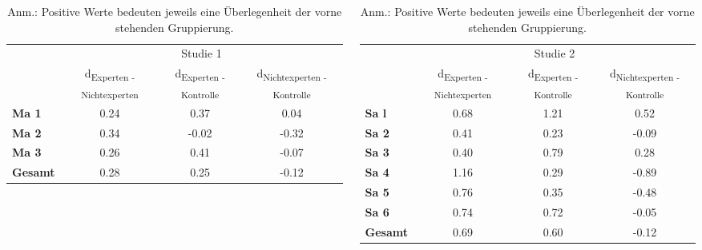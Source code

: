 \documentclass[final]{beamer}
\newlength{\onecolwid}
\newlength{\twocolwid}
\begin{document}
\begin{frame}[t]
\begin{columns}[t]
\begin{column}{\twocolwid}
\begin{columns}[t,totalwidth=\twocolwid]
\begin{column}{\onecolwid}
\begin{table}
\begin{tabular}{lccc}
\toprule 
 & \multicolumn{3}{c}{Studie 1} \\
\cmidrule{2-4}
 & d\textsubscript{Experten - Nichtexperten} & d\textsubscript{Experten - Kontrolle} & d\textsubscript{Nichtexperten - Kontrolle} \\
\midrule 
\textbf{Ma 1} & 0.24 & 0.37 & 0.04 \\
\textbf{Ma 2} & 0.34 & -0.02 & -0.32 \\
\textbf{Ma 3} & 0.26 & 0.41 & -0.07 \\
\midrule 
\textbf{Gesamt} & 0.28 & 0.25 & -0.12 \\
\bottomrule
\end{tabular}
{\caption*{Anm.: Positive Werte bedeuten jeweils eine Überlegenheit der vorne stehenden Gruppierung.}}
\end{table}

\end{column} %


\begin{column}{\onecolwid}\vspace{-.6in} %


\begin{table}
\begin{tabular}{lccc}
\toprule 
 & \multicolumn{3}{c}{Studie 2} \\
\cmidrule{2-4}
 & d\textsubscript{Experten - Nichtexperten} & d\textsubscript{Experten - Kontrolle} & d\textsubscript{Nichtexperten - Kontrolle} \\
\midrule 
\textbf{Sa l} & 0.68 & 1.21 & 0.52 \\
\textbf{Sa 2} & 0.41 & 0.23 & -0.09 \\
\textbf{Sa 3} & 0.40 & 0.79 & 0.28 \\
\textbf{Sa 4} & 1.16 & 0.29 & -0.89 \\
\textbf{Sa 5} & 0.76 & 0.35 & -0.48 \\
\textbf{Sa 6} & 0.74 & 0.72 & -0.05 \\
\midrule 
\textbf{Gesamt} & 0.69 & 0.60 & -0.12 \\
\bottomrule
\end{tabular}
{\caption*{Anm.: Positive Werte bedeuten jeweils eine Überlegenheit der vorne stehenden Gruppierung.}}
\end{table}


\end{column} %
\end{columns} %



\end{column}
\end{columns}
\end{frame}
\end{document}
